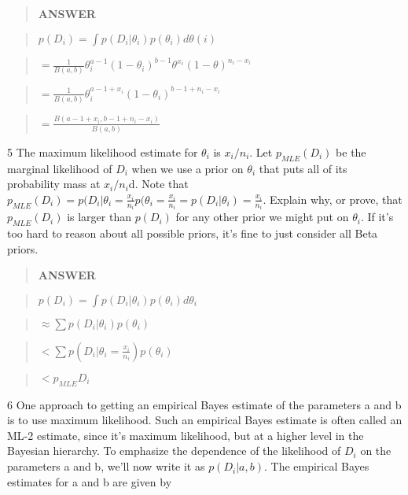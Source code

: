\documentclass[11pt]{article}
\begin{document}
\begin{quote}
\textbf{ANSWER}
\end{quote}

\begin{quote}
\(p(D_i)=\int p(D_i|\theta_i)p(\theta_i)d\theta(i)\)
\end{quote}

\begin{quote}
\(=\frac{1}{B(a,b)}\theta_i^{a-1}(1-\theta_i)^{b-1}\theta^{x_i}(1-\theta)^{n_i-x_i}\)
\end{quote}

\begin{quote}
\(=\frac{1}{B(a,b)}\theta_i^{a-1+x_i}(1-\theta_i)^{b-1+n_i-x_i}\)
\end{quote}

\begin{quote}
\(=\frac{B(a-1+x_i, b-1+n_i-x_i)}{B(a,b)}\)
\end{quote}

    5 The maximum likelihood estimate for \(\theta_i\) is \(x_i/n_i\). Let
\(p_{MLE}(D_i)\) be the marginal likelihood of \(D_i\) when we use a
prior on \(\theta_i\) that puts all of its probability mass at
\(x_i/n_i\)d. Note that
\(p_{MLE}(D_i) = p(D_i|\theta_i =\frac{x_i}{n_i}p(\theta_i =\frac{x_i}{n_i}= p(D_i|\theta_i) =\frac{x_i}{n_i}\).
Explain why, or prove, that \(p_{MLE}(D_i)\) is larger than \(p(D_i)\)
for any other prior we might put on \(\theta_i\). If it's too hard to
reason about all possible priors, it's fine to just consider all Beta
priors.

    \begin{quote}
\textbf{ANSWER}
\end{quote}

\begin{quote}
\(p(D_i)=\int p(D_i|\theta_i)p(\theta_i)d\theta_i\)
\end{quote}

\begin{quote}
\(\approx \sum p(D_i|\theta_i)p(\theta_i)\)
\end{quote}

\begin{quote}
\(<\sum p(D_i|\theta_i=\frac{x_i}{n_i})p(\theta_i)\)
\end{quote}

\begin{quote}
\(<p_{MLE}D_i\)
\end{quote}

    6 One approach to getting an empirical Bayes estimate of the parameters
a and b is to use maximum likelihood. Such an empirical Bayes estimate
is often called an ML-2 estimate, since it's maximum likelihood, but at
a higher level in the Bayesian hierarchy. To emphasize the dependence of
the likelihood of \(D_i\) on the parameters a and b, we'll now write it
as \(p(D_i| a, b)\). The empirical Bayes estimates for a and b are given
by
\end{document}
